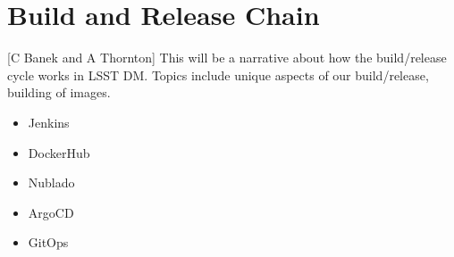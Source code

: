 \section{Build and Release Chain}[C Banek and A Thornton]
This will be a narrative about how the build/release cycle works in LSST DM.
Topics include unique aspects of our build/release, building of images.
\begin{itemize}
\item Jenkins
\item DockerHub
\item Nublado
\item ArgoCD
\item GitOps
\end{itemize}
